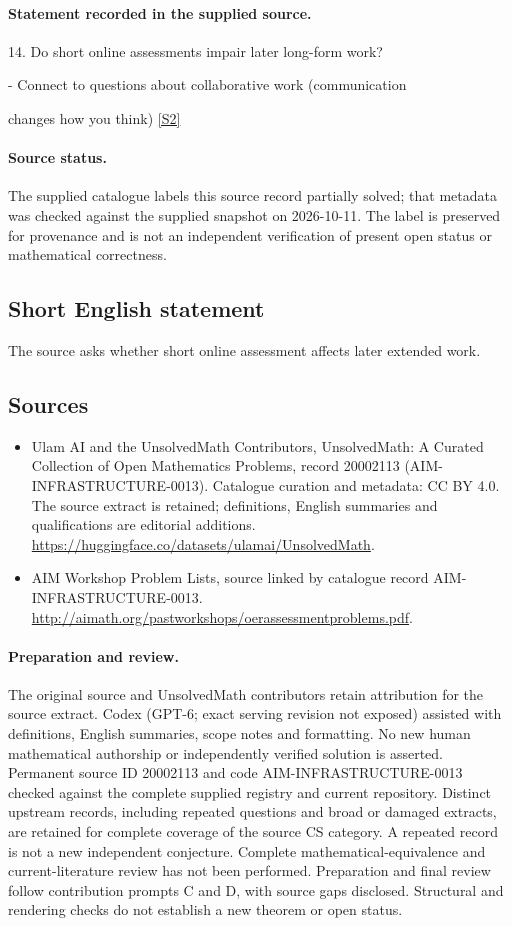 \documentclass[11pt]{article}
\begin{document}
\paragraph{Statement recorded in the supplied source.}
14. Do short online assessments impair later long-form work?

- Connect to questions about collaborative work (communication

changes how you think) \href{http://aimath.org/pastworkshops/oerassessmentproblems.pdf}{[S2]}
\paragraph{Source status.}
The supplied catalogue labels this source record partially solved; that metadata was checked against the supplied snapshot on 2026-10-11. The label is preserved for provenance and is not an independent verification of present open status or mathematical correctness.
\subsection{Short English statement}
The source asks whether short online assessment affects later extended work.
\subsection{Sources}
\begin{itemize}
\item[S1] Ulam AI and the UnsolvedMath Contributors, UnsolvedMath: A Curated Collection of Open Mathematics Problems, record 20002113 (AIM-INFRASTRUCTURE-0013). Catalogue curation and metadata: CC BY 4.0. The source extract is retained; definitions, English summaries and qualifications are editorial additions.
\url{https://huggingface.co/datasets/ulamai/UnsolvedMath}.
\item[S2] AIM Workshop Problem Lists, source linked by catalogue record AIM-INFRASTRUCTURE-0013.
\url{http://aimath.org/pastworkshops/oerassessmentproblems.pdf}.
\end{itemize}
\paragraph{Preparation and review.}
The original source and UnsolvedMath contributors retain attribution for the source extract. Codex (GPT-6; exact serving revision not exposed) assisted with definitions, English summaries, scope notes and formatting. No new human mathematical authorship or independently verified solution is asserted. Permanent source ID 20002113 and code AIM-INFRASTRUCTURE-0013 checked against the complete supplied registry and current repository. Distinct upstream records, including repeated questions and broad or damaged extracts, are retained for complete coverage of the source CS category. A repeated record is not a new independent conjecture. Complete mathematical-equivalence and current-literature review has not been performed. Preparation and final review follow contribution prompts C and D, with source gaps disclosed. Structural and rendering checks do not establish a new theorem or open status.
\label{end:20002113}
\end{document}
